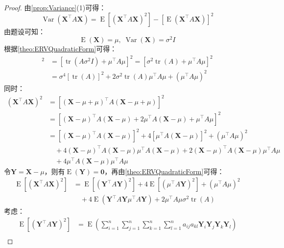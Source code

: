 \begin{proof}
	由\cref{prop:Variance}(1)可得：
	\begin{equation*}
		\operatorname{Var}(\mathbf{X}^{\top}A\mathbf{X})=\operatorname{E}[(\mathbf{X}^{\top}A\mathbf{X})^2]-[\operatorname{E}(\mathbf{X}^{\top}A\mathbf{X})]^2 
	\end{equation*}
	由题设可知：
	\begin{equation*}
		\operatorname{E}(\mathbf{X})=\mu,\;\operatorname{Var}(\mathbf{X})=\sigma^2I
	\end{equation*}
	根据\cref{theo:ERVQuadraticForm}可得：
	\begin{align*}
		[\operatorname{E}(\mathbf{X}^{\top}A\mathbf{X})]^2&=[\operatorname{tr}(A\sigma^2I)+\mu^{\top}A\mu]^2=[\sigma^2\operatorname{tr}(A)+\mu^{\top}A\mu]^2 \\
		&=\sigma^4[\operatorname{tr}(A)]^2+2\sigma^2\operatorname{tr}(A)\mu^{\top}A\mu+(\mu^{\top}A\mu)^2
	\end{align*}
	同时：
	\begin{align*}
		(\mathbf{X}^{\top}A\mathbf{X})^2
		&=[(\mathbf{X}-\mu+\mu)^{\top}A(\mathbf{X}-\mu+\mu)]^2 \\
		&=[(\mathbf{X}-\mu)^{\top}A(\mathbf{X}-\mu)+2\mu^{\top}A(\mathbf{X}-\mu)+\mu^{\top}A\mu]^2 \\
		&=[(\mathbf{X}-\mu)^{\top}A(\mathbf{X}-\mu)]^2+4[\mu^{\top}A(\mathbf{X}-\mu)]^2+(\mu^{\top}A\mu)^2 \\
		&\quad+4(\mathbf{X}-\mu)^{\top}A(\mathbf{X}-\mu)\mu^{\top}A(\mathbf{X}-\mu)+2(\mathbf{X}-\mu)^{\top}A(\mathbf{X}-\mu)\mu^{\top}A\mu \\
		&\quad+4\mu^{\top}A(\mathbf{X}-\mu)\mu^{\top}A\mu
	\end{align*}
	令$\mathbf{Y}=\mathbf{X}-\mu$，则有$\operatorname{E}(\mathbf{Y})=\mathbf{0}$，再由\cref{theo:ERVQuadraticForm}可得：
	\begin{align*}
		\operatorname{E}[(\mathbf{X}^{\top}A\mathbf{X})^2]
		&=\operatorname{E}[(\mathbf{Y}^{\top}A\mathbf{Y})^2]+4\operatorname{E}[(\mu^{\top}A\mathbf{Y})^2]+(\mu^{\top}A\mu)^2 \\
		&\quad+4\operatorname{E}(\mathbf{Y}^{\top}A\mathbf{Y}\mu^{\top}A\mathbf{Y})+2\mu^{\top}A\mu\sigma^2\operatorname{tr}(A)
	\end{align*}
	考虑：
	\begin{align*}
		\operatorname{E}[(\mathbf{Y}^{\top}A\mathbf{Y})^2]
		&=\operatorname{E}\left(\sum_{i=1}^{n}\sum_{j=1}^{n}\sum_{k=1}^{n}\sum_{l=1}^{n}a_{ij}a_{kl}\mathbf{Y}_i\mathbf{Y}_j\mathbf{Y}_k\mathbf{Y}_l\right) \\

\end{align*}
\end{proof}
